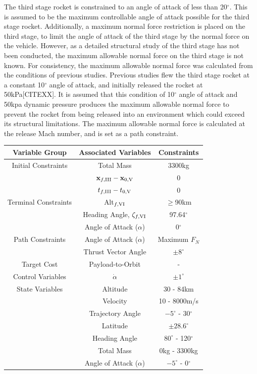 The third stage rocket is constrained to an angle of attack of less than 20$^\circ$. This is assumed to be the maximum controllable angle of attack possible for the third stage rocket.   
Additionally, a maximum normal force restriction is placed on the third stage, to limit the angle of attack of the third stage by the normal force on the vehicle. However, as a detailed structural study of the third stage has not been conducted, the maximum allowable normal force on the third stage is not known.
For consistency, the maximum allowable normal force was calculated from the conditions of previous studies. Previous studies flew the third stage rocket at a constant 10$^\circ$ angle of attack, and initially released the rocket at 50kPa[CITEXX]. 
It is assumed that this condition of 10$^\circ$ angle of attack and 50kpa dynamic pressure produces the maximum allowable normal force to prevent the rocket from being released into an environment which could exceed its structural limitations. The maximum allowable normal force is calculated at the release Mach number, and is set as a path constraint. 
\begin{table}[ht]
	\centering
\begin{tabular}{|c|c|c|}
\hline \textbf{Variable Group}  & \textbf{Associated Variables} & \textbf{Constraints}\\	\hline Initial Constraints  & Total Mass & 3300kg\\  & $\textbf{x}_{f,\textrm{\rom{3}}} - \textbf{x}_{0,\textrm{\rom{5}}}$ & 0\\ & $t_{f,\textrm{\rom{3}}} - t_{0,\textrm{\rom{5}}}$ & 0\\
	\hline Terminal Constraints & Alt$_{f,\textrm{\rom{6}}}$ & $\geq$90km\\ & Heading Angle, $\zeta_{f,\textrm{\rom{6}}}$ & 97.64$^\circ$\\  & Angle of Attack ($\alpha$) & 0$^\circ$\\
	\hline Path Constraints & Angle of Attack ($\alpha$) & Maximum $F_N$\\  & Thrust Vector Angle & $\pm8^\circ$\\ 
	\hline Target Cost & Payload-to-Orbit & -\\ 
				\hline Control Variables & $\dot{\alpha}$ & $\pm1^\circ$\\ 
				\hline State Variables & Altitude & 30 - 84km\\ & Velocity& 10 - 8000m/s\\ & Trajectory Angle& $-5^\circ$ - 30$^\circ$ \\   & Latitude&$\pm28.6^\circ$ \\   & Heading Angle& $80^\circ$ - 120$^\circ$\\  & Total Mass& 0kg - 3300kg \\  & Angle of Attack ($\alpha$)&  $-5^\circ$ - 0$^\circ$\\ 
	\hline 
\end{tabular} 
\end{table}

